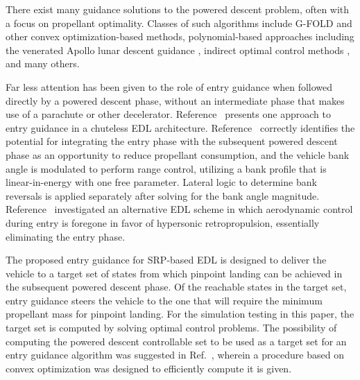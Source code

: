 
There exist many guidance solutions to the powered descent problem, often with a focus on propellant optimality. Classes of such algorithms include G-FOLD \cite{gfold,gfold_flighttests} and other convex optimization-based methods, polynomial-based approaches including the venerated Apollo lunar descent guidance \cite{apollo_lunar}, indirect optimal control methods \cite{PropellantOptimalAdaptiveTrigger}, and many others. 

Far less attention has been given to the role of entry guidance when followed directly by a powered descent phase, without an intermediate phase that makes use of a parachute or other decelerator. Reference~\cite{LuAdaptiveEDL} presents one approach to entry guidance in a chuteless EDL architecture. Reference~\cite{LuAdaptiveEDL} correctly identifies the potential for integrating the entry phase with the subsequent powered descent phase as an opportunity to reduce propellant consumption, and the vehicle bank angle is modulated to perform range control, utilizing a bank profile that is linear-in-energy with one free parameter. Lateral logic to determine bank reversals is applied separately after solving for the bank angle magnitude. Reference~\cite{EDL_AllProp} investigated an alternative EDL scheme in which aerodynamic control during entry is foregone in favor of hypersonic retropropulsion, essentially eliminating the entry phase. 

The proposed entry guidance for SRP-based EDL is designed to deliver the vehicle to a target set of states from which pinpoint landing can be achieved in the subsequent powered descent phase. Of the reachable states in the target set, entry guidance steers the vehicle to the one that will require the minimum propellant mass for pinpoint landing. For the simulation testing in this paper, the target set is computed by solving optimal control problems. 
The possibility of computing the powered descent controllable set to be used as a target set for an entry guidance algorithm was suggested in Ref.~\cite{SRP_ControllableSets}, wherein a procedure based on convex optimization was designed to efficiently compute it is given.

